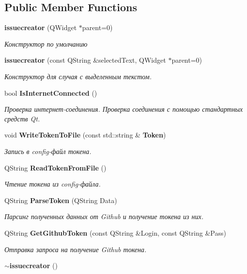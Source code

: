 \subsection*{Public Member Functions}
\begin{DoxyCompactItemize}
\item 
\textbf{ issuecreator} (Q\+Widget $\ast$parent=0)
\begin{DoxyCompactList}\small\item\em Конструктор по умолчанию \end{DoxyCompactList}\item 
\textbf{ issuecreator} (const Q\+String \&selected\+Text, Q\+Widget $\ast$parent=0)
\begin{DoxyCompactList}\small\item\em Конструктор для случая с выделенным текстом. \end{DoxyCompactList}\item 
bool \textbf{ Is\+Internet\+Connected} ()
\begin{DoxyCompactList}\small\item\em Проверка интернет-\/соединения. Проверка соединения с помощью стандартных средств Qt. \end{DoxyCompactList}\item 
void \textbf{ Write\+Token\+To\+File} (const std\+::string \&\textbf{ Token})
\begin{DoxyCompactList}\small\item\em Запись в config-\/файл токена. \end{DoxyCompactList}\item 
Q\+String \textbf{ Read\+Token\+From\+File} ()
\begin{DoxyCompactList}\small\item\em Чтение токена из config-\/файла. \end{DoxyCompactList}\item 
Q\+String \textbf{ Parse\+Token} (Q\+String Data)
\begin{DoxyCompactList}\small\item\em Парсинг полученных данных от Github и получение токена из них. \end{DoxyCompactList}\item 
Q\+String \textbf{ Get\+Github\+Token} (const Q\+String \&Login, const Q\+String \&Pass)
\begin{DoxyCompactList}\small\item\em Отправка запроса на получение Github токена. \end{DoxyCompactList}\item 
\textbf{ $\sim$issuecreator} ()
\end{DoxyCompactItemize}
